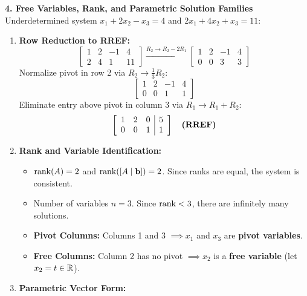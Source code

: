\textbf{4. Free Variables, Rank, and Parametric Solution Families}
Underdetermined system $x_1 + 2x_2 - x_3 = 4$ and $2x_1 + 4x_2 + x_3 = 11$:
\begin{enumerate}
    \item \textbf{Row Reduction to RREF:}
    \begin{equation*}
    \left[\begin{array}{ccc|c}
    1 & 2 & -1 & 4 \\
    2 & 4 & 1 & 11
    \end{array}\right]
    \xrightarrow{R_2 \to R_2 - 2R_1}
    \left[\begin{array}{ccc|c}
    1 & 2 & -1 & 4 \\
    0 & 0 & 3 & 3
    \end{array}\right]
    \end{equation*}
    Normalize pivot in row 2 via $R_2 \to \frac{1}{3} R_2$:
    \begin{equation*}
    \left[\begin{array}{ccc|c}
    1 & 2 & -1 & 4 \\
    0 & 0 & 1 & 1
    \end{array}\right]
    \end{equation*}
    Eliminate entry above pivot in column 3 via $R_1 \to R_1 + R_2$:
    \begin{equation*}
    \left[\begin{array}{ccc|c}
    1 & 2 & 0 & 5 \\
    0 & 0 & 1 & 1
    \end{array}\right] \quad \text{\textbf{(RREF)}}
    \end{equation*}
    \item \textbf{Rank and Variable Identification:}
    \begin{itemize}
        \item $\operatorname{rank}(A) = 2$ and $\operatorname{rank}([A \mid \mathbf{b}]) = 2$. Since ranks are equal, the system is consistent.
        \item Number of variables $n = 3$. Since $\operatorname{rank} < 3$, there are infinitely many solutions.
        \item \textbf{Pivot Columns:} Columns 1 and 3 $\implies x_1$ and $x_3$ are \textbf{pivot variables}.
        \item \textbf{Free Columns:} Column 2 has no pivot $\implies x_2$ is a \textbf{free variable} (let $x_2 = t \in \mathbb{R}$).
    \end{itemize}
    \item \textbf{Parametric Vector Form:}

\end{enumerate}
